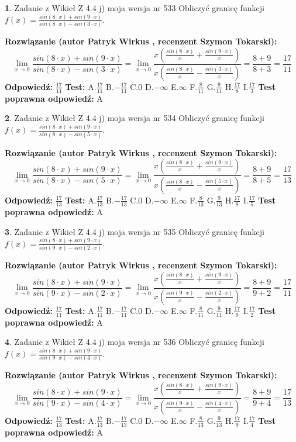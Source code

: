\documentclass[12pt, a4paper]{article}
\theoremstyle{definition} %
\newtheorem{zad}{}
\newcommand{\zadStart}[1]{\begin{zad}#1\newline}
\newcommand{\zadStop}{\end{zad}}
\newcommand{\rozwStart}[2]{\noindent \textbf{Rozwiązanie (autor #1 , recenzent #2): }\newline}
\newcommand{\rozwStop}{\newline}
\newcommand{\odpStart}{\noindent \textbf{Odpowiedź:}\newline}
\newcommand{\odpStop}{\newline}
\newcommand{\testStart}{\noindent \textbf{Test:}\newline}
\newcommand{\testStop}{\newline}
\newcommand{\kluczStart}{\noindent \textbf{Test poprawna odpowiedź:}\newline}
\newcommand{\kluczStop}{\newline}
\begin{document}
\zadStart{Zadanie z Wikieł Z 4.4 j) moja wersja nr 533}
Obliczyć granicę funkcji $f(x)=\frac{sin(8\cdot x) +sin(9\cdot x)}{sin(8\cdot x) -sin(3\cdot x)}$.
\zadStop
\rozwStart{Patryk Wirkus}{Szymon Tokarski}
$$\lim\limits_{x\to 0}\frac{sin(8\cdot x) +sin(9\cdot x)}{sin(8\cdot x) -sin(3\cdot x)}=\lim\limits_{x\to 0}\frac{x(\frac{sin(8\cdot x)}{x}+\frac{sin(9\cdot x)}{x})}{x(\frac{sin(8\cdot x)}{x}-\frac{sin(3\cdot x)}{x})}=\frac{8+9}{8+3} = \frac{17}{11}$$
\rozwStop
\odpStart
$\frac{17}{11}$
\odpStop
\testStart
A.$\frac{17}{11}$
B.$-\frac{17}{11}$
C.$0$
D.$-\infty$
E.$\infty$
F.$\frac{8}{11}$
G.$\frac{9}{11}$
H.$\frac{17}{8}$
I.$\frac{17}{3}$
\testStop
\kluczStart
A
\kluczStop



\zadStart{Zadanie z Wikieł Z 4.4 j) moja wersja nr 534}
Obliczyć granicę funkcji $f(x)=\frac{sin(8\cdot x) +sin(9\cdot x)}{sin(8\cdot x) -sin(5\cdot x)}$.
\zadStop
\rozwStart{Patryk Wirkus}{Szymon Tokarski}
$$\lim\limits_{x\to 0}\frac{sin(8\cdot x) +sin(9\cdot x)}{sin(8\cdot x) -sin(5\cdot x)}=\lim\limits_{x\to 0}\frac{x(\frac{sin(8\cdot x)}{x}+\frac{sin(9\cdot x)}{x})}{x(\frac{sin(8\cdot x)}{x}-\frac{sin(5\cdot x)}{x})}=\frac{8+9}{8+5} = \frac{17}{13}$$
\rozwStop
\odpStart
$\frac{17}{13}$
\odpStop
\testStart
A.$\frac{17}{13}$
B.$-\frac{17}{13}$
C.$0$
D.$-\infty$
E.$\infty$
F.$\frac{8}{13}$
G.$\frac{9}{13}$
H.$\frac{17}{8}$
I.$\frac{17}{5}$
\testStop
\kluczStart
A
\kluczStop



\zadStart{Zadanie z Wikieł Z 4.4 j) moja wersja nr 535}
Obliczyć granicę funkcji $f(x)=\frac{sin(8\cdot x) +sin(9\cdot x)}{sin(9\cdot x) -sin(2\cdot x)}$.
\zadStop
\rozwStart{Patryk Wirkus}{Szymon Tokarski}
$$\lim\limits_{x\to 0}\frac{sin(8\cdot x) +sin(9\cdot x)}{sin(9\cdot x) -sin(2\cdot x)}=\lim\limits_{x\to 0}\frac{x(\frac{sin(8\cdot x)}{x}+\frac{sin(9\cdot x)}{x})}{x(\frac{sin(9\cdot x)}{x}-\frac{sin(2\cdot x)}{x})}=\frac{8+9}{9+2} = \frac{17}{11}$$
\rozwStop
\odpStart
$\frac{17}{11}$
\odpStop
\testStart
A.$\frac{17}{11}$
B.$-\frac{17}{11}$
C.$0$
D.$-\infty$
E.$\infty$
F.$\frac{8}{11}$
G.$\frac{9}{11}$
H.$\frac{17}{9}$
I.$\frac{17}{2}$
\testStop
\kluczStart
A
\kluczStop



\zadStart{Zadanie z Wikieł Z 4.4 j) moja wersja nr 536}
Obliczyć granicę funkcji $f(x)=\frac{sin(8\cdot x) +sin(9\cdot x)}{sin(9\cdot x) -sin(4\cdot x)}$.
\zadStop
\rozwStart{Patryk Wirkus}{Szymon Tokarski}
$$\lim\limits_{x\to 0}\frac{sin(8\cdot x) +sin(9\cdot x)}{sin(9\cdot x) -sin(4\cdot x)}=\lim\limits_{x\to 0}\frac{x(\frac{sin(8\cdot x)}{x}+\frac{sin(9\cdot x)}{x})}{x(\frac{sin(9\cdot x)}{x}-\frac{sin(4\cdot x)}{x})}=\frac{8+9}{9+4} = \frac{17}{13}$$
\rozwStop
\odpStart
$\frac{17}{13}$
\odpStop
\testStart
A.$\frac{17}{13}$
B.$-\frac{17}{13}$
C.$0$
D.$-\infty$
E.$\infty$
F.$\frac{8}{13}$
G.$\frac{9}{13}$
H.$\frac{17}{9}$
I.$\frac{17}{4}$
\testStop
\kluczStart
A
\kluczStop
\end{document}
